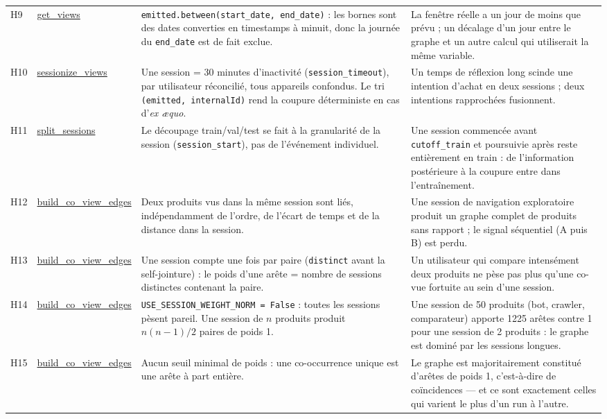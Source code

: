 \documentclass[11pt,a4paper]{article}
\newcommand{\code}[1]{\texttt{\small #1}}
\begin{document}
{\begin{longtable}{@{}l p{2.45cm} p{5.9cm} p{4.5cm}@{}}
\addlinespace
H9 & \url{get_views} & \code{emitted.between(start\_date, end\_date)} : les bornes sont des dates converties en timestamps à minuit, donc la journée du \code{end\_date} est de fait exclue. & La fenêtre réelle a un jour de moins que prévu ; un décalage d'un jour entre le graphe et un autre calcul qui utiliserait la même variable. \\
\addlinespace
H10 & \url{sessionize_views} & Une session = 30 minutes d'inactivité (\code{session\_timeout}), par utilisateur réconcilié, tous appareils confondus. Le tri \code{(emitted, internalId)} rend la coupure déterministe en cas d'\emph{ex æquo}. & Un temps de réflexion long scinde une intention d'achat en deux sessions ; deux intentions rapprochées fusionnent. \\
\addlinespace
H11 & \url{split_sessions} & Le découpage train/val/test se fait à la granularité de la session (\code{session\_start}), pas de l'événement individuel. & Une session commencée avant \code{cutoff\_train} et poursuivie après reste entièrement en train : de l'information postérieure à la coupure entre dans l'entraînement. \\
\addlinespace
H12 & \url{build_co_view_edges} & Deux produits vus dans la même session sont liés, indépendamment de l'ordre, de l'écart de temps et de la distance dans la session. & Une session de navigation exploratoire produit un graphe complet de produits sans rapport ; le signal séquentiel (A puis B) est perdu. \\
\addlinespace
H13 & \url{build_co_view_edges} & Une session compte une fois par paire (\code{distinct} avant la self-jointure) : le poids d'une arête = nombre de sessions distinctes contenant la paire. & Un utilisateur qui compare intensément deux produits ne pèse pas plus qu'une co-vue fortuite au sein d'une session. \\
\addlinespace
H14 & \url{build_co_view_edges} & \code{USE\_SESSION\_WEIGHT\_NORM = False} : toutes les sessions pèsent pareil. Une session de $n$ produits produit $n(n-1)/2$ paires de poids 1. & Une session de 50 produits (bot, crawler, comparateur) apporte 1225 arêtes contre 1 pour une session de 2 produits : le graphe est dominé par les sessions longues. \\
\addlinespace
H15 & \url{build_co_view_edges} & Aucun seuil minimal de poids : une co-occurrence unique est une arête à part entière. & Le graphe est majoritairement constitué d'arêtes de poids 1, c'est-à-dire de coïncidences --- et ce sont exactement celles qui varient le plus d'un run à l'autre. \\

\end{longtable}}
\end{document}
